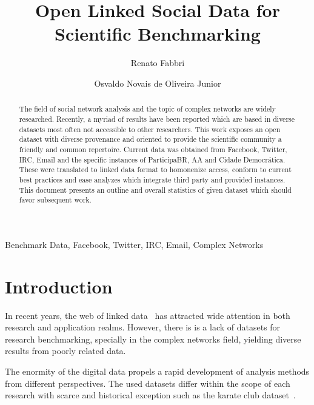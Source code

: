 \documentclass[review]{elsarticle}
\begin{document}
%
\begin{frontmatter}
%
\title{Open Linked Social Data for Scientific Benchmarking}
%
\author[pwr]{Renato Fabbri}
%
\author[pwr]{Osvaldo Novais de Oliveira Junior}
%
\address[pwr]{S\~ao Carlos Institute of Physics, S\~ao Paulo
University, Brazil}
%
%
\begin{abstract}
The field of social network analysis and the topic of complex networks
are widely researched.
Recently, a myriad of results have been reported which are based in
diverse datasets most often not accessible to other researchers.
This work exposes an open dataset with diverse provenance and oriented
to provide the scientific community a friendly and common repertoire.
Current data was obtained from Facebook, Twitter, IRC, Email and the specific
instances of ParticipaBR, AA and Cidade Democr\'atica.
These were translated to linked data format to homonenize access,
conform to current best practices and ease analyzes which integrate third
party and provided instances.
This document presents an outline and overall statistics of given
dataset which should favor subsequent work.
\end{abstract}
%
\begin{keyword}
Benchmark Data, Facebook, Twitter, IRC, Email, Complex Networks
\end{keyword}

\end{frontmatter}

\section{Introduction}
In recent years, the web of linked data~\cite{lee1} has attracted wide attention in
both research and application realms.
However, there is is a lack of datasets for research benchmarking,
specially in the complex networks field, yielding diverse results from 
poorly related data.

The enormity of the digital data propels a rapid development of analysis methods
from different perspectives.
The used datasets differ within the scope of each research with
scarce and historical exception such as the
karate club dataset~\cite{newmanBook}.
 
\end{document}
